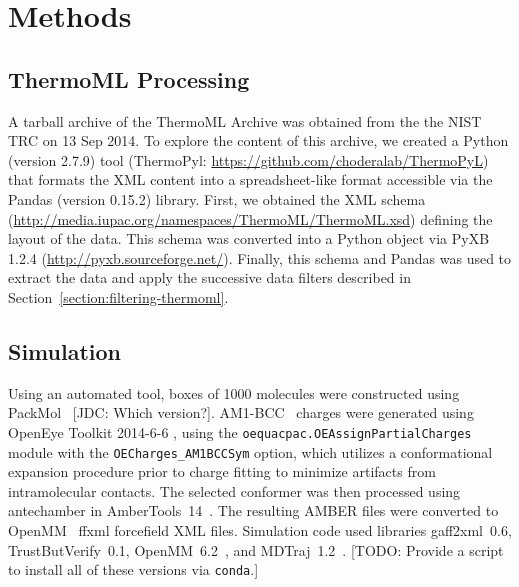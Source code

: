 \documentclass[aps,pre,twocolumn,nofootinbib,superscriptaddress,linenumbers]{revtex4-1}
\begin{document}

\section{Methods}

\subsection{ThermoML Processing}

A tarball archive of the ThermoML Archive was obtained from the the NIST TRC on 13 Sep 2014.
To explore the content of this archive, we created a Python (version 2.7.9) tool (ThermoPyl: \url{https://github.com/choderalab/ThermoPyL}) that formats the XML content into a spreadsheet-like format accessible via the Pandas (version 0.15.2) library.  
First, we obtained the XML schema (\url{http://media.iupac.org/namespaces/ThermoML/ThermoML.xsd}) defining the layout of the data.
This schema was converted into a Python object via PyXB 1.2.4 (\url{http://pyxb.sourceforge.net/}).
Finally, this schema and Pandas was used to extract the data and apply the successive data filters described in Section~\ref{section:filtering-thermoml}.  

\subsection{Simulation}
Using an automated tool, boxes of 1000 molecules were constructed using PackMol~\cite{martinez2009packmol} {\color{red}[JDC: Which version?]}. 
AM1-BCC~\cite{am1bcc1,am1bcc2} charges were generated using OpenEye Toolkit 2014-6-6 \cite{openeye}, using the {\tt oequacpac.OEAssignPartialCharges} module with the {\tt OECharges\_AM1BCCSym} option, which utilizes a conformational expansion procedure prior to charge fitting to minimize artifacts from intramolecular contacts.  
The selected conformer was then processed using antechamber in AmberTools~14~\cite{amber14}.  
The resulting AMBER files were converted to OpenMM~\cite{eastman2012openmm} ffxml forcefield XML files.  
Simulation code used libraries gaff2xml~0.6, TrustButVerify~0.1, OpenMM~6.2~\cite{eastman2012openmm}, and MDTraj~1.2~\cite{mcgibbon2014mdtraj}.  
{\color{red}[TODO: Provide a script to install all of these versions via {\tt conda}.]}
\end{document}
